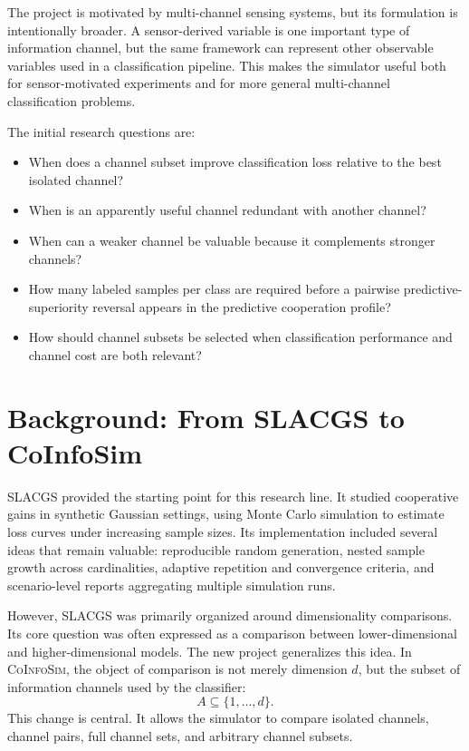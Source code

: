 \documentclass[11pt,a4paper]{article}
\newcommand{\CoInfoSim}{\textsc{CoInfoSim}}
\newcommand{\SLACGS}{\textsc{SLACGS}}
\begin{document}
The project is motivated by multi-channel sensing systems, but its formulation is intentionally broader. A sensor-derived variable is one important type of information channel, but the same framework can represent other observable variables used in a classification pipeline. This makes the simulator useful both for sensor-motivated experiments and for more general multi-channel classification problems.

The initial research questions are:
\begin{itemize}
    \item When does a channel subset improve classification loss relative to the best isolated channel?
    \item When is an apparently useful channel redundant with another channel?
    \item When can a weaker channel be valuable because it complements stronger channels?
    \item How many labeled samples per class are required before a pairwise predictive-superiority reversal appears in the predictive cooperation profile?
    \item How should channel subsets be selected when classification performance and channel cost are both relevant?
\end{itemize}

\section{Background: From SLACGS to CoInfoSim}

\SLACGS{} provided the starting point for this research line. It studied cooperative gains in synthetic Gaussian settings, using Monte Carlo simulation to estimate loss curves under increasing sample sizes. Its implementation included several ideas that remain valuable: reproducible random generation, nested sample growth across cardinalities, adaptive repetition and convergence criteria, and scenario-level reports aggregating multiple simulation runs.

However, \SLACGS{} was primarily organized around dimensionality comparisons. Its core question was often expressed as a comparison between lower-dimensional and higher-dimensional models. The new project generalizes this idea. In \CoInfoSim{}, the object of comparison is not merely dimension $d$, but the subset of information channels used by the classifier:
\[
    A \subseteq \{1,\ldots,d\}.
\]
This change is central. It allows the simulator to compare isolated channels, channel pairs, full channel sets, and arbitrary channel subsets.
\end{document}
